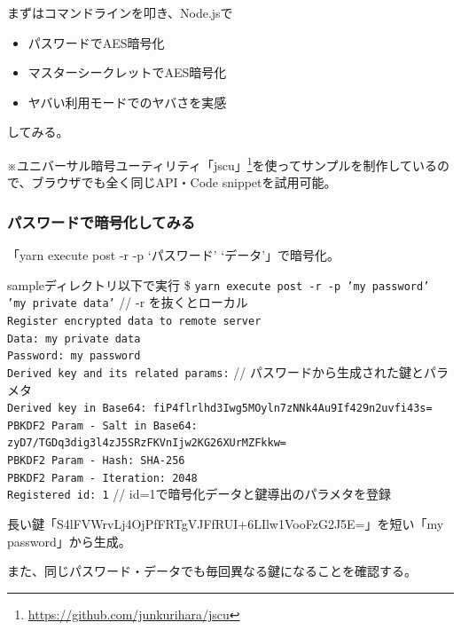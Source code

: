 \documentclass[12pt,dvipdfmx]{beamer}
\begin{document}
\begin{frame}
まずはコマンドラインを叩き、Node.jsで
\begin{itemize}
 \item パスワードでAES暗号化
 \item マスターシークレットでAES暗号化
 \item ヤバい利用モードでのヤバさを実感
\end{itemize}
してみる。

\vspace{2ex}

※ユニバーサル暗号ユーティリティ「jscu」\footnote[frame]{\url{https://github.com/junkurihara/jscu}}を使ってサンプルを制作しているので、\alert{ブラウザでも全く同じAPI・Code snippetを試用可能。}
\end{frame}

\begin{frame}
\frametitle{パスワードで暗号化してみる}
\small

「yarn execute post -r -p `パスワード' `データ'」で暗号化。

\begin{block}{\small sampleディレクトリ以下で実行}
\scriptsize
\$ \texttt{yarn execute post -r -p 'my password' 'my private data'} // -r を抜くとローカル\\
\texttt{Register encrypted data to remote server}\\
\texttt{Data: my private data}\\
\texttt{Password: my password}\\
{\color{red}
\texttt{Derived key and its related params:} // パスワードから生成された鍵とパラメタ\\
\texttt{\quad Derived key in Base64: fiP4flrlhd3Iwg5MOyln7zNNk4Au9If429n2uvfi43s=}\\
\texttt{\quad PBKDF2 Param - Salt in Base64: zyD7/TGDq3dig3l4zJ5SRzFKVnIjw2KG26XUrMZFkkw=}\\
\texttt{\quad PBKDF2 Param - Hash: SHA-256}\\
\texttt{\quad PBKDF2 Param - Iteration: 2048}
}\\
\texttt{Registered id: 1} // id=1で暗号化データと鍵導出のパラメタを登録
\end{block}

長い鍵「S4lFVWrvLj4OjPfFRTgVJFfRUI+6LIlw1VooFzG2J5E=」を短い「my password」から生成。

また、同じパスワード・データでも毎回異なる鍵になることを確認する。
\end{frame}
\end{document}
